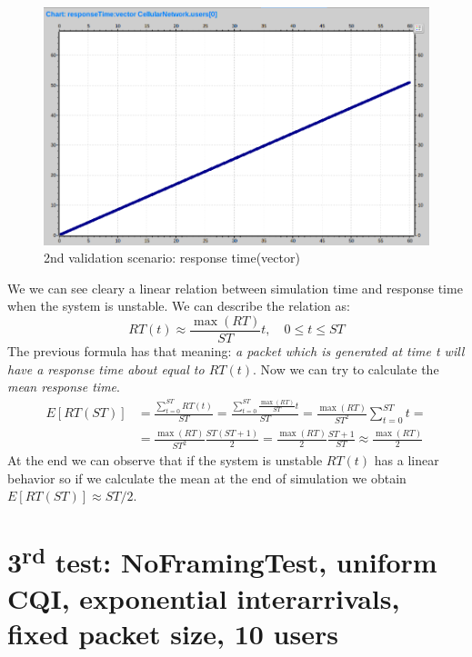 \begin{figure}[H]
  \includegraphics[width=1\textwidth]{images/response-timeVec}
  \caption{2nd validation scenario: response time(vector)}
  \label{fig:2nd validation scenario: response time(vector)}
\end{figure}
We we can see cleary a linear relation between simulation time and response time when the system is unstable. We can describe the relation as:
\begin{equation} 
	RT(t) \approx \frac{\max(RT)}{ST}t, \quad 0\le t \le ST 
\end{equation}
The previous formula has that meaning: \textit{a packet which is generated at time t will have a response time about equal to \(RT(t)\)}. Now we can try to calculate the \textit{mean response time}.
\begin{equation}
\begin{split}
E[RT(ST)] &= \frac{\sum\limits^{ST}_{t=0} RT(t)}{ST} = \frac{\sum\limits^{ST}_{t=0} \frac{\max(RT)}{ST}t}{ST} = \frac{\max(RT)}{ST^2}\sum\limits^{ST}_{t=0}t =
	\\ &= \frac{\max(RT)}{ST^2}\frac{ST(ST+1)}{2} = \frac{\max(RT)}{2}\frac{ST+1}{ST} \approx \frac{\max(RT)}{2}
\end{split}
\end{equation}
At the end we can observe that if the system is unstable \(RT(t)\) has a linear behavior so if we calculate the mean at the end of simulation we obtain \(E[RT(ST)] \approx ST/2\). 


\section{3\textsuperscript{rd} test: NoFramingTest, uniform CQI, exponential interarrivals, fixed packet size, 10 users}

